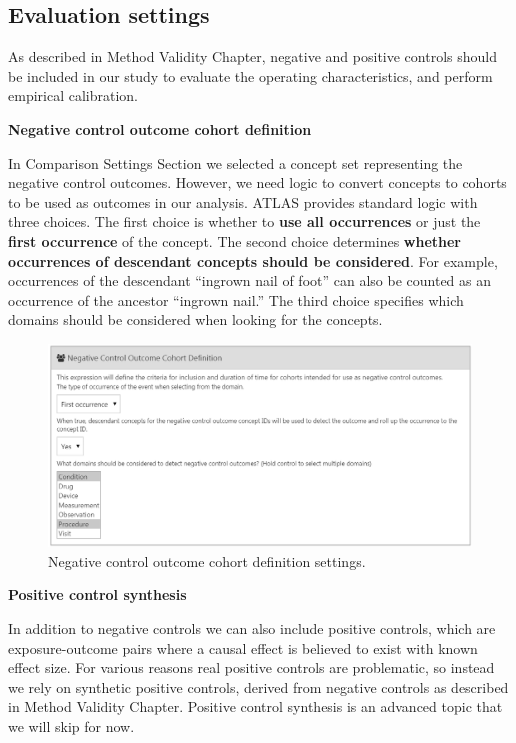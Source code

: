 \documentclass[]{book}
\begin{document}
\hypertarget{evaluationSettings}{%
\subsection{Evaluation settings}\label{evaluationSettings}}

As described in Method Validity Chapter, negative and positive controls should be included in our study to evaluate the operating characteristics, and perform empirical calibration.

\textbf{Negative control outcome cohort definition}

In Comparison Settings Section we selected a concept set representing the negative control outcomes. However, we need logic to convert concepts to cohorts to be used as outcomes in our analysis. ATLAS provides standard logic with three choices. The first choice is whether to \textbf{use all occurrences} or just the \textbf{first occurrence} of the concept. The second choice determines \textbf{whether occurrences of descendant concepts should be considered}. For example, occurrences of the descendant ``ingrown nail of foot'' can also be counted as an occurrence of the ancestor ``ingrown nail.'' The third choice specifies which domains should be considered when looking for the concepts.

\begin{figure}

{\centering \includegraphics[width=1\linewidth]{images/PopulationLevelEstimation/ncSettings} 

}

\caption{Negative control outcome cohort definition settings.}\label{fig:ncSettings}
\end{figure}

\textbf{Positive control synthesis}

In addition to negative controls we can also include positive controls, which are exposure-outcome pairs where a causal effect is believed to exist with known effect size. For various reasons real positive controls are problematic, so instead we rely on synthetic positive controls, derived from negative controls as described in Method Validity Chapter. Positive control synthesis is an advanced topic that we will skip for now.
\end{document}
